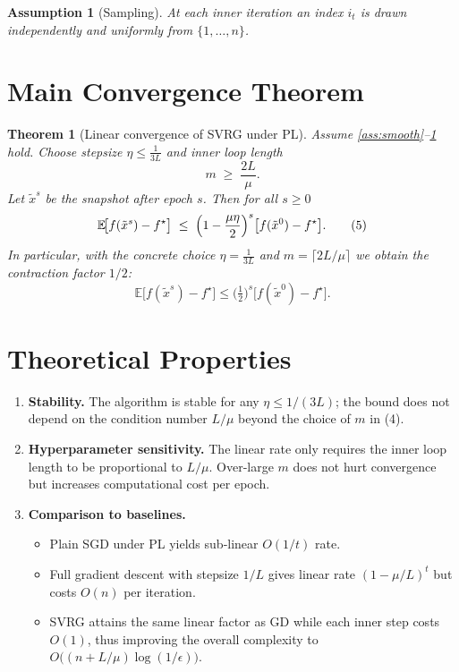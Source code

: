 \documentclass{article}
\newcommand{\E}{\mathbb{E}}
\newtheorem{theorem}{Theorem}
\newtheorem{assumption}{Assumption}
\begin{document}
\begin{assumption}[Sampling]\label{ass:sampling}
At each inner iteration an index $i_t$ is drawn independently and uniformly
from $\{1,\dots,n\}$.
\end{assumption}

\section*{Main Convergence Theorem}
\begin{theorem}[Linear convergence of SVRG under PL]\label{thm:linear}
Assume \ref{ass:smooth}–\ref{ass:sampling} hold.  
Choose stepsize $\displaystyle \eta\le\frac{1}{3L}$ and inner loop length
\[
m\;\ge\;\frac{2L}{\mu}.
\tag{4}
\]
Let $\tilde{x}^{s}$ be the snapshot after epoch $s$. Then for all $s\ge0$
\[
\E\!\bigl[f(\tilde{x}^{s})-f^{\star}\bigr]\;\le\;\Bigl(1-\frac{\mu\eta}{2}\Bigr)^{s}
\bigl[f(\tilde{x}^{0})-f^{\star}\bigr].
\tag{5}
\]
In particular, with the concrete choice $\eta=\frac{1}{3L}$ and
$m= \lceil 2L/\mu\rceil$ we obtain the contraction factor $1/2$:
\[
\E\!\bigl[f(\tilde{x}^{s})-f^{\star}\bigr]\le \bigl(\tfrac12\bigr)^{s}
\bigl[f(\tilde{x}^{0})-f^{\star}\bigr].
\tag{6}
\]
\end{theorem}

\section*{Theoretical Properties}
\begin{enumerate}[label=\arabic*.]
\item \textbf{Stability.} The algorithm is stable for any $\eta\le 1/(3L)$; the bound
does not depend on the condition number $L/\mu$ beyond the choice of $m$ in (4).
\item \textbf{Hyperparameter sensitivity.} The linear rate only requires the
inner loop length to be proportional to $L/\mu$. Over‑large $m$ does not hurt
convergence but increases computational cost per epoch.
\item \textbf{Comparison to baselines.}
    \begin{itemize}
        \item Plain SGD under PL yields sub‑linear $O(1/t)$ rate.
        \item Full gradient descent with stepsize $1/L$ gives linear rate
              $(1-\mu/L)^{t}$ but costs $O(n)$ per iteration.
        \item SVRG attains the same linear factor as GD while each inner step costs
              $O(1)$, thus improving the overall complexity to
              $O\bigl((n+L/\mu)\log(1/\epsilon)\bigr)$.
    \end{itemize}
\end{enumerate}
\end{document}
